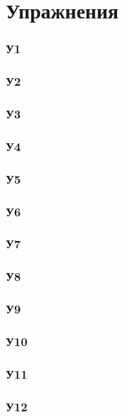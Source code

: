 \section{Упражнения}

\subsubsection*{У1}


\subsubsection*{У2}


\subsubsection*{У3}


\subsubsection*{У4}


\subsubsection*{У5}


\subsubsection*{У6}


\subsubsection*{У7}


\subsubsection*{У8}


\subsubsection*{У9}


\subsubsection*{У10}


\subsubsection*{У11}


\subsubsection*{У12}

